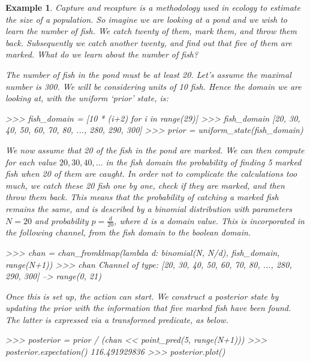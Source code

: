 \documentclass[leqno]{tufte-book} %
\newtheorem{example}[theorem]{Example}
\begin{document}
\begin{example}
\label{ex:capture}
Capture and recapture is a methodology used
in ecology to estimate the size of a population. So imagine we are
looking at a pond and we wish to learn the number of fish. We catch
twenty of them, mark them, and throw them back. Subsequently we catch
another twenty, and find out that five of them are marked. What do we
learn about the number of fish?

The number of fish in the pond must be at least 20. Let's assume the
maximal number is 300. We will be considering units of 10 fish. Hence
the domain we are looking at, with the uniform `prior' state, is:
\begin{python}
>>> fish_domain = [10 * (i+2) for i in range(29)]
>>> fish_domain
[20, 30, 40, 50, 60, 70, 80, ..., 280, 290, 300]
>>> prior = uniform_state(fish_domain)
\end{python}

\noindent We now assume that 20 of the fish in the pond are marked. We
can then compute for each value $20, 30, 40, \ldots$ in the fish
domain the probability of finding 5 marked fish when 20 of them are
caught. In order not to complicate the calculations too much, we catch
these 20 fish one by one, check if they are marked, and then throw
them back. This means that the probability of catching a marked fish
remains the same, and is described by a binomial distribution with
parameters $N=20$ and probability $p = \frac{d}{20}$, where $d$ is a
domain value. This is incorporated in the following channel, from the
fish domain to the boolean domain.
\begin{python}
>>> chan = chan_fromklmap(lambda d: binomial(N, N/d), fish_domain, range(N+1))
>>> chan
Channel of type: [20, 30, 40, 50, 60, 70, 80, ..., 280, 290, 300] --> range(0, 21)
\end{python}

\noindent Once this is set up, the action can start. We construct
a posterior state by updating the prior with the information that
five marked fish have been found. The latter is expressed via
a transformed predicate, as below.
\begin{python}
>>> posterior = prior / (chan << point_pred(5, range(N+1)))
>>> posterior.expectation()
116.491929836
>>> posterior.plot()
\end{python}


\end{example}
\end{document}
